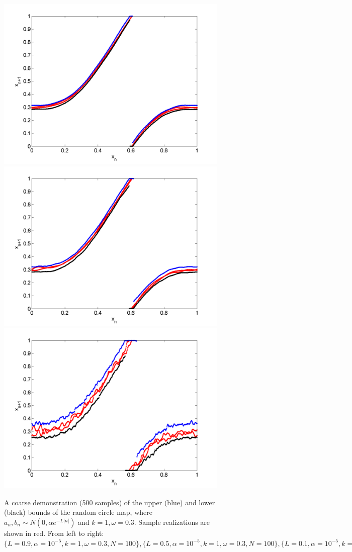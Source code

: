 \begin{figure}[htp]
\caption[Upper and lower bounds on the random circle map, Normal
distribution for $k=1,\omega=0.3$]{A coarse
  demonstration (500 samples) of the upper (blue) and lower (black)
  bounds of the random circle map, where $a_n,b_n\sim N(0,\alpha e^{-L|n|})$
  and $k=1,\omega=0.3$. Sample realizations are shown in red. From left to right:
  $\{L=0.9,\alpha = 10^{-5},k=1,\omega=0.3,N=100\}, \{L=0.5,\alpha = 10^{-5},k=1,\omega=0.3,N=100\},\{L=0.1,\alpha = 10^{-5},k=1,\omega=0.3,N=100\},$
  }\label{fig:circ_n_envelope1}
\centering
\includegraphics[width=.3\textwidth]{figs/envelope_norm_500_k1_L09_w03.png}\hfill
\includegraphics[width=.3\textwidth]{figs/envelope_norm_500_k1_L05_w03.png}\hfill
\includegraphics[width=.3\textwidth]{figs/envelope_norm_500_k1_L01_w03.png}
\end{figure}

